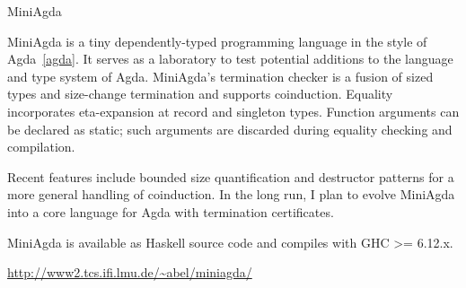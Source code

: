 \begin{hcarentry}{MiniAgda}
\makeheader

MiniAgda is a tiny dependently-typed programming language in the style
of Agda~\cref{agda}. It serves as a laboratory to test 
potential additions to the
language and type system of Agda. MiniAgda's termination checker is a
fusion of sized types and size-change termination and supports
coinduction. Equality incorporates eta-expansion at record and
singleton types. Function arguments can be declared as static; such
arguments are discarded during equality checking and compilation.

Recent features include bounded size quantification and destructor
patterns for a more general handling of coinduction.  In the long
run, I plan to evolve MiniAgda into a core language for Agda with
termination certificates.

MiniAgda is available as Haskell source code and compiles with GHC
>= 6.12.x. 

\FurtherReading
  \url{http://www2.tcs.ifi.lmu.de/\~abel/miniagda/}
\end{hcarentry}
